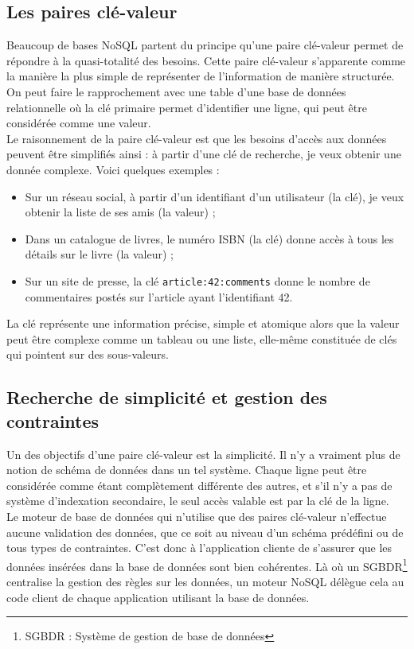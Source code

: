 \subsection{Les paires clé-valeur}
	Beaucoup de bases NoSQL partent du principe qu'une paire clé-valeur permet de répondre à la quasi-totalité des besoins. Cette paire clé-valeur s'apparente comme la manière la plus simple de représenter de l'information de manière structurée. On peut faire le rapprochement avec une table d'une base de données relationnelle où la clé primaire permet d'identifier une ligne, qui peut être considérée comme une valeur.\\

	Le raisonnement de la paire clé-valeur est que les besoins d'accès aux données peuvent être simplifiés ainsi : à partir d'une clé de recherche, je veux obtenir une donnée complexe. Voici quelques exemples :
	\begin{itemize}
		\item Sur un réseau social, à partir d'un identifiant d'un utilisateur (la clé), je veux obtenir la liste de ses amis (la valeur) ;
		\item Dans un catalogue de livres, le numéro ISBN (la clé) donne accès à tous les détails sur le livre (la valeur) ;
		\item Sur un site de presse, la clé \texttt{article:42:comments} donne le nombre de commentaires postés sur l'article ayant l'identifiant 42.
	\end{itemize}
	\vspace{20px}

	La clé représente une information précise, simple et atomique alors que la valeur peut être complexe comme un tableau ou une liste, elle-même constituée de clés qui pointent sur des sous-valeurs.

\subsection{Recherche de simplicité et gestion des contraintes}
	Un des objectifs d'une paire clé-valeur est la simplicité. Il n'y a vraiment plus de notion de schéma de données dans un tel système. Chaque ligne peut être considérée comme étant complètement différente des autres, et s'il n'y a pas de système d'indexation secondaire, le seul accès valable est par la clé de la ligne.\\

	Le moteur de base de données qui n'utilise que des paires clé-valeur n'effectue aucune validation des données, que ce soit au niveau d'un schéma prédéfini ou de tous types de contraintes. C'est donc à l'application cliente de s'assurer que les données insérées dans la base de données sont bien cohérentes. Là où un SGBDR\footnote{SGBDR : Système de gestion de base de données} centralise la gestion des règles sur les données, un moteur NoSQL délègue cela au code client de chaque application utilisant la base de données.

